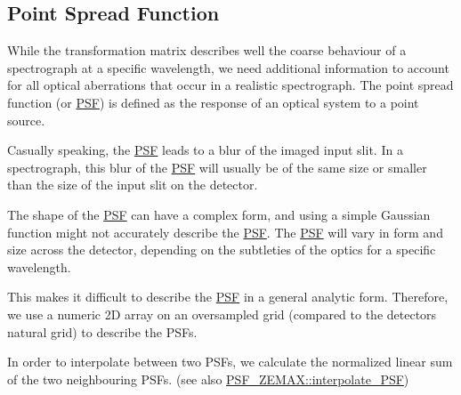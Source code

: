 \subsection*{Point Spread Function}

While the transformation matrix describes well the coarse behaviour of a spectrograph at a specific wavelength, we need additional information to account for all optical aberrations that occur in a realistic spectrograph. The point spread function (or \hyperlink{class_p_s_f}{P\+SF}) is defined as the response of an optical system to a point source.

Casually speaking, the \hyperlink{class_p_s_f}{P\+SF} leads to a blur of the imaged input slit. In a spectrograph, this blur of the \hyperlink{class_p_s_f}{P\+SF} will usually be of the same size or smaller than the size of the input slit on the detector.

The shape of the \hyperlink{class_p_s_f}{P\+SF} can have a complex form, and using a simple Gaussian function might not accurately describe the \hyperlink{class_p_s_f}{P\+SF}. The \hyperlink{class_p_s_f}{P\+SF} will vary in form and size across the detector, depending on the subtleties of the optics for a specific wavelength.

This makes it difficult to describe the \hyperlink{class_p_s_f}{P\+SF} in a general analytic form. Therefore, we use a numeric 2D array on an oversampled grid (compared to the detector\textquotesingle{}s natural grid) to describe the P\+S\+Fs.

In order to interpolate between two P\+S\+Fs, we calculate the normalized linear sum of the two neighbouring P\+S\+Fs. (see also \hyperlink{class_p_s_f___z_e_m_a_x_ad3b5bb955539e861246cc0f3e3add141}{P\+S\+F\+\_\+\+Z\+E\+M\+A\+X\+::interpolate\+\_\+\+P\+SF}) 